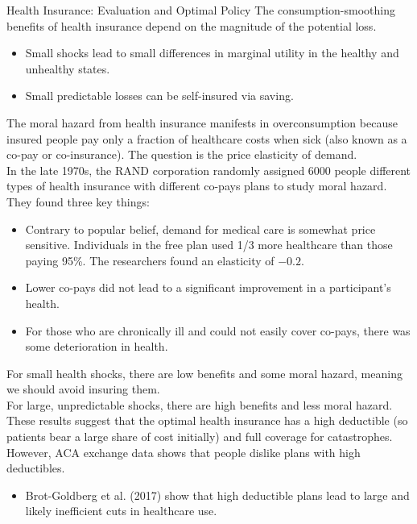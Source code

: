 \documentclass[8pt]{extarticle}
\begin{document}
  \begin{problem}{Health Insurance: Evaluation and Optimal Policy}
    The consumption-smoothing benefits of health insurance depend on the magnitude of the potential loss.
    \begin{itemize}
      \item Small shocks lead to small differences in marginal utility in the healthy and unhealthy states.
      \item Small predictable losses can be self-insured via saving.
    \end{itemize}
    The moral hazard from health insurance manifests in overconsumption because insured people pay only a fraction of healthcare costs when sick (also known as a co-pay or co-insurance). The question is the price elasticity of demand.\\

    In the late 1970s, the RAND corporation randomly assigned 6000 people different types of health insurance with different co-pays plans to study moral hazard. They found three key things:
    \begin{itemize}
      \item Contrary to popular belief, demand for medical care is somewhat price sensitive. Individuals in the free plan used 1/3 more healthcare than those paying 95\%. The researchers found an elasticity of $-0.2$.
      \item Lower co-pays did not lead to a significant improvement in a participant's health.
      \item For those who are chronically ill and could not easily cover co-pays, there was some deterioration in health.
    \end{itemize}
    For small health shocks, there are low benefits and some moral hazard, meaning we should avoid insuring them.\\

    For large, unpredictable shocks, there are high benefits and less moral hazard.\\

    These results suggest that the optimal health insurance has a high deductible (so patients bear a large share of cost initially) and full coverage for catastrophes.\\

    However, ACA exchange data shows that people dislike plans with high deductibles.
    \begin{itemize}
      \item Brot-Goldberg et al. (2017) show that high deductible plans lead to large and likely inefficient cuts in healthcare use.
    \end{itemize}
  \end{problem}
\end{document}
